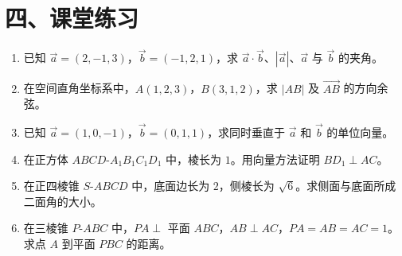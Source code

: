 \documentclass[12pt, a4paper]{ctexart}
\begin{document}
\section*{\textcolor{tipgreen}{四、课堂练习}}

\begin{enumerate}
  \item 已知 $\vec{a}=(2,-1,3)$，$\vec{b}=(-1,2,1)$，求 $\vec{a}\cdot\vec{b}$、$|\vec{a}|$、$\vec{a}$ 与 $\vec{b}$ 的夹角。

  \item 在空间直角坐标系中，$A(1,2,3)$，$B(3,1,2)$，求 $|AB|$ 及 $\overrightarrow{AB}$ 的方向余弦。

  \item 已知 $\vec{a}=(1,0,-1)$，$\vec{b}=(0,1,1)$，求同时垂直于 $\vec{a}$ 和 $\vec{b}$ 的单位向量。

  \item 在正方体 $ABCD$-$A_1B_1C_1D_1$ 中，棱长为 $1$。用向量方法证明 $BD_1\perp AC$。

  \item 在正四棱锥 $S$-$ABCD$ 中，底面边长为 $2$，侧棱长为 $\sqrt{6}$。求侧面与底面所成二面角的大小。

  \item 在三棱锥 $P$-$ABC$ 中，$PA\perp$ 平面 $ABC$，$AB\perp AC$，$PA=AB=AC=1$。求点 $A$ 到平面 $PBC$ 的距离。
\end{enumerate}
\end{document}
